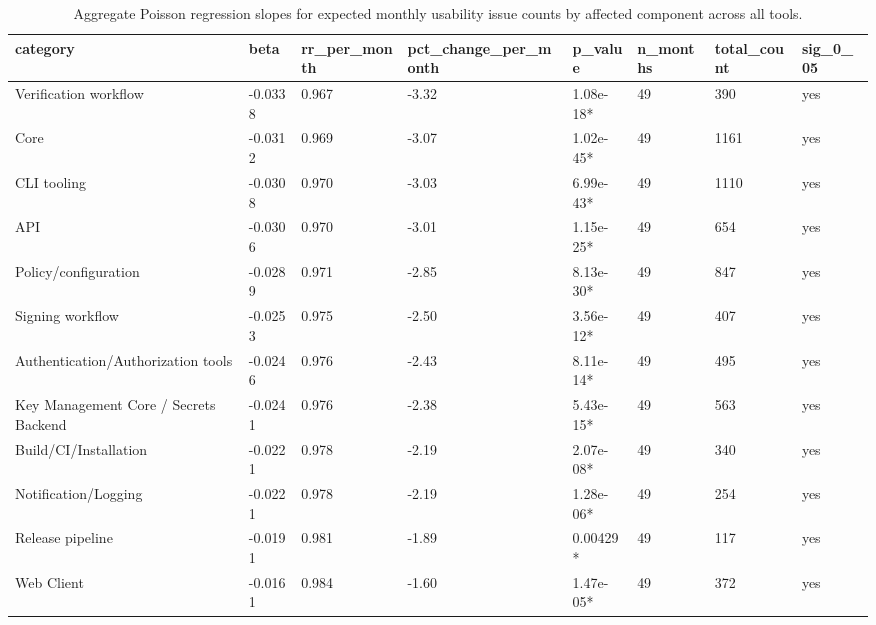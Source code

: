 \begin{table}[t]
\centering
\caption{Aggregate Poisson regression slopes for expected monthly usability issue counts by affected component across all tools.}
\label{tab:poisson-aggregate-component}
\scriptsize
\begin{tabular}{llllllll}
\hline
category & beta & rr\_per\_month & pct\_change\_per\_month & p\_value & n\_months & total\_count & sig\_0\_05 \\
\hline
Verification workflow & -0.0338 & 0.967 & -3.32 & 1.08e-18* & 49 & 390 & yes \\
Core & -0.0312 & 0.969 & -3.07 & 1.02e-45* & 49 & 1161 & yes \\
CLI tooling & -0.0308 & 0.970 & -3.03 & 6.99e-43* & 49 & 1110 & yes \\
API & -0.0306 & 0.970 & -3.01 & 1.15e-25* & 49 & 654 & yes \\
Policy/configuration & -0.0289 & 0.971 & -2.85 & 8.13e-30* & 49 & 847 & yes \\
Signing workflow & -0.0253 & 0.975 & -2.50 & 3.56e-12* & 49 & 407 & yes \\
Authentication/Authorization tools & -0.0246 & 0.976 & -2.43 & 8.11e-14* & 49 & 495 & yes \\
Key Management Core / Secrets Backend & -0.0241 & 0.976 & -2.38 & 5.43e-15* & 49 & 563 & yes \\
Build/CI/Installation & -0.0221 & 0.978 & -2.19 & 2.07e-08* & 49 & 340 & yes \\
Notification/Logging & -0.0221 & 0.978 & -2.19 & 1.28e-06* & 49 & 254 & yes \\
Release pipeline & -0.0191 & 0.981 & -1.89 & 0.00429* & 49 & 117 & yes \\
Web Client & -0.0161 & 0.984 & -1.60 & 1.47e-05* & 49 & 372 & yes \\
\hline
\end{tabular}
\end{table}
